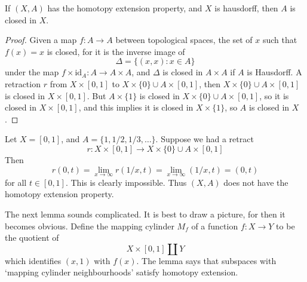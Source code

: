 \begin{theorem}
    If $(X,A)$ has the homotopy extension property, and $X$ is hausdorff, then $A$ is closed in $X$.
\end{theorem}
\begin{proof}
    Given a map $f: A \to A$ between topological spaces, the set of $x$ such that $f(x) = x$ is closed, for it is the inverse image of
    \[ \Delta = \{ (x,x) : x \in A \} \]
    under the map $f \times \text{id}_A: A \to A \times A$, and $\Delta$ is closed in $A \times A$ if $A$ is Hausdorff. A retraction $r$ from $X \times [0,1]$ to $X \times \{ 0 \} \cup A \times [0,1]$, then $X \times \{ 0 \} \cup A \times [0,1]$ is closed in $X \times [0,1]$. But $A \times \{ 1 \}$ is closed in $X \times \{ 0 \} \cup A \times [0,1]$, so it is closed in $X \times [0,1]$, and this implies it is closed in $X \times \{ 1 \}$, so $A$ is closed in $X$.
\end{proof}

\begin{example}
    Let $X = [0,1]$, and $A = \{ 1, 1/2, 1/3, \dots \}$. Suppose we had a retract
    \[ r: X \times [0,1] \to X \times \{ 0 \} \cup A \times [0,1] \]
    Then
    \[ r(0,t) = \lim_{x \to \infty} r(1/x, t) = \lim_{x \to \infty} (1/x,t) = (0,t) \]
    for all $t \in [0,1]$. This is clearly impossible. Thus $(X,A)$ does not have the homotopy extension property.
\end{example}

The next lemma sounds complicated. It is best to draw a picture, for then it becomes obvious. Define the mapping cylinder $M_f$ of a function $f:X \to Y$ to be the quotient of
%
\[ X \times [0,1] \coprod Y \]
%
which identifies $(x,1)$ with $f(x)$. The lemma says that subspaces with `mapping cylinder neighbourhoods' satisfy homotopy extension.

